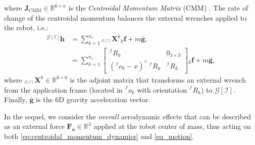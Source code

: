 where $\boldsymbol{J}_\text{CMM} \in \mathbb{R}^{6\times n}$ is the \emph{Centroidal Momentum Matrix} (CMM) \cite{orin08}.
The rate of change of the centroidal momentum balances the external wrenches applied to the robot, i.e.:
\begin{equation}\label{eq:centroidal_momentum_dynamics}
	\begin{split}
		{}^{\mathcal{G}[\mathcal{I}]}  \dot{\boldsymbol{h}} &= \sum_{k = 1}^{n_c} {}_{{}^{\mathcal{G}[\mathcal{I}]}}\boldsymbol{X}^k {}_k\textbf{f} + m \bar{\boldsymbol{g}}, \\
		&= \sum_{k = 1}^{n_c} \begin{bmatrix}
			{}^{\mathcal{I}}R_k & 0_{3\times 3} \\
			({}^{\mathcal{I}}o_k - x)^\wedge\,{}^{\mathcal{I}}R_k & {}^{\mathcal{I}}R_k
		\end{bmatrix} {}_k\textbf{f} + m \bar{\boldsymbol{g}}, 
	\end{split}
\end{equation}
where ${}_{{}^{\mathcal{G}[\mathcal{I}]}}\boldsymbol{X}^k \in \mathbb{R}^{6 \times 6}$ is the adjoint matrix that transforms an external wrench from the application frame (located in ${}^{\mathcal{I}}o_k$ with orientation ${}^{\mathcal{I}}R_k$) to ${\mathcal{G}[\mathcal{I}]}$. Finally, $\bar{\boldsymbol{g}}$
is the 6D gravity acceleration vector.

In the sequel, we consider the \emph{overall} aerodynamic effects that can be described as an external force $\boldsymbol{F_a} \in \mathbb{R}^3$ applied at the robot center of mass, thus acting on both  \eqref{eq:centroidal_momentum_dynamics} and \eqref{eq_motion}.


